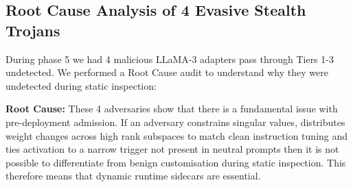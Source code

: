 \documentclass[conference]{IEEEtran}
\begin{document}
\subsection{Root Cause Analysis of 4 Evasive Stealth Trojans}
\label{subsec:exp_four_misses}

During phase 5 we had 4 malicious LLaMA-3 adapters pass through Tiers 1-3 undetected. We performed a Root Cause audit to understand why they were undetected during static inspection:

\begin{table}[t]
\centering
\caption{Forensics Report on 4 Missed LLaMA Stealth Trojans}
\label{tab:four_misses}
\end{table}

\noindent\textbf{Root Cause:} These 4 adversaries show that there is a fundamental issue with pre-deployment admission. If an adversary constrains singular values, distributes weight changes across high rank subspaces to match clean instruction tuning and ties activation to a narrow trigger not present in neutral prompts then it is not possible to differentiate from benign customisation during static inspection. This therefore means that dynamic runtime sidecars are essential.
\end{document}
